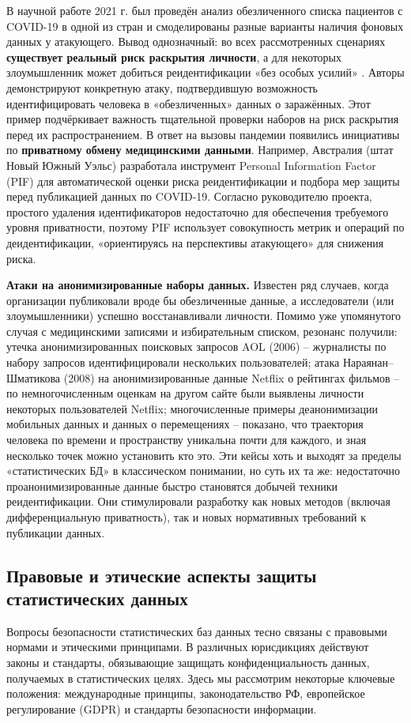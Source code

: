 В научной работе 2021 г. был проведён анализ обезличенного списка пациентов
с COVID-19 в одной из стран и смоделированы разные варианты наличия фоновых данных у атакующего. Вывод однозначный: во
всех рассмотренных сценариях \textbf{существует реальный риск раскрытия личности}, а для некоторых злоумышленник может
добиться реидентификации «без особых усилий» \autocite{journals-plos-org}. Авторы демонстрируют конкретную атаку,
подтвердившую возможность идентифицировать человека в «обезличенных» данных о заражённых. Этот пример подчёркивает
важность тщательной проверки наборов на риск раскрытия перед их распространением. В ответ на вызовы пандемии появились
инициативы по \textbf{приватному обмену медицинскими данными}. Например, Австралия (штат Новый Южный Уэльс) разработала
инструмент Personal Information Factor (PIF) для автоматической оценки риска реидентификации и подбора мер защиты перед
публикацией данных по COVID-19. Согласно руководителю проекта, простого удаления идентификаторов недостаточно для
обеспечения требуемого уровня приватности, поэтому PIF использует совокупность метрик и операций по деидентификации,
«ориентируясь на перспективы атакующего» для снижения риска.

\textbf{Атаки на анонимизированные наборы данных.}
Известен ряд случаев, когда организации публиковали вроде бы обезличенные данные, а исследователи (или злоумышленники) успешно
восстанавливали личности. Помимо уже упомянутого случая с медицинскими записями и избирательным списком, резонанс
получили: утечка анонимизированных поисковых запросов AOL (2006) – журналисты по набору запросов идентифицировали
нескольких пользователей; атака Нараянан–Шматикова (2008) на анонимизированные данные Netflix \autocite{narayanan2008} о рейтингах фильмов – по
немногочисленным оценкам на другом сайте были выявлены личности некоторых пользователей Netflix; многочисленные примеры
деанонимизации мобильных данных и данных о перемещениях – показано, что траектория человека по времени и пространству
уникальна почти для каждого, и зная несколько точек можно установить кто это. Эти кейсы хоть и выходят за пределы
«статистических БД» в классическом понимании, но суть их та же: недостаточно проанонимизированные данные быстро
становятся добычей техники реидентификации. Они стимулировали разработку как новых методов (включая дифференциальную
приватность), так и новых нормативных требований к публикации данных.

\subsection{Правовые и этические аспекты защиты статистических данных}
Вопросы безопасности статистических баз данных тесно связаны с правовыми нормами и этическими принципами. В различных
юрисдикциях действуют законы и стандарты, обязывающие защищать конфиденциальность данных, получаемых в статистических
целях. Здесь мы рассмотрим некоторые ключевые положения: международные принципы, законодательство РФ, европейское
регулирование (GDPR) и стандарты безопасности информации.

